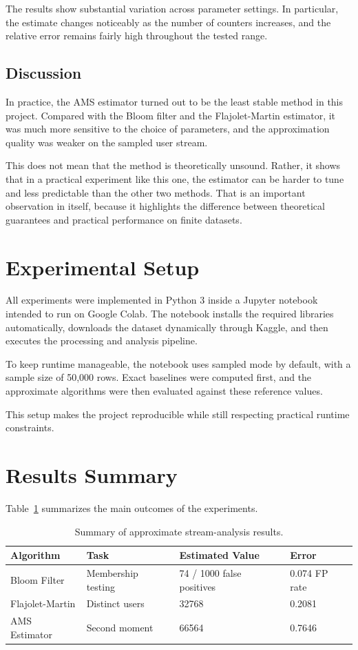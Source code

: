 \documentclass[11pt,a4paper]{article}
\begin{document}
The results show substantial variation across parameter settings. In particular, the estimate changes noticeably as the number of counters increases, and the relative error remains fairly high throughout the tested range.

\subsection*{Discussion}
In practice, the AMS estimator turned out to be the least stable method in this project. Compared with the Bloom filter and the Flajolet-Martin estimator, it was much more sensitive to the choice of parameters, and the approximation quality was weaker on the sampled user stream.

This does not mean that the method is theoretically unsound. Rather, it shows that in a practical experiment like this one, the estimator can be harder to tune and less predictable than the other two methods. That is an important observation in itself, because it highlights the difference between theoretical guarantees and practical performance on finite datasets.

\section{Experimental Setup}

All experiments were implemented in Python 3 inside a Jupyter notebook intended to run on Google Colab. The notebook installs the required libraries automatically, downloads the dataset dynamically through Kaggle, and then executes the processing and analysis pipeline.

To keep runtime manageable, the notebook uses sampled mode by default, with a sample size of 50{,}000 rows. Exact baselines were computed first, and the approximate algorithms were then evaluated against these reference values.

This setup makes the project reproducible while still respecting practical runtime constraints.

\section{Results Summary}

Table~\ref{tab:results} summarizes the main outcomes of the experiments.

\begin{table}[H]
\centering
\begin{tabular}{llll}
\toprule
Algorithm & Task & Estimated Value & Error \\
\midrule
Bloom Filter & Membership testing & 74 / 1000 false positives & 0.074 FP rate \\
Flajolet-Martin & Distinct users & 32768 & 0.2081 \\
AMS Estimator & Second moment & 66564 & 0.7646 \\
\bottomrule
\end{tabular}
\caption{Summary of approximate stream-analysis results.}
\label{tab:results}
\end{table}
\end{document}

